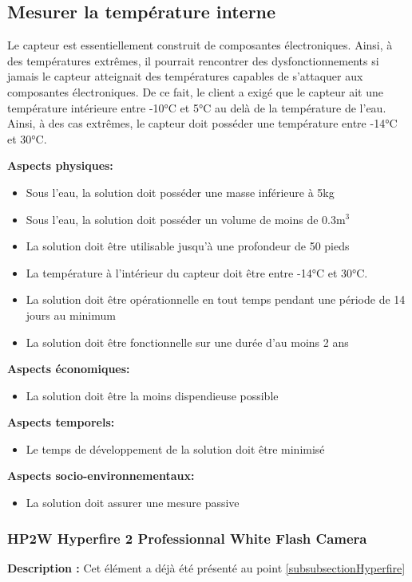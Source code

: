\subsection{Mesurer la température interne}
Le capteur est essentiellement construit de composantes électroniques. Ainsi, à des températures extrêmes, il pourrait rencontrer des dysfonctionnements si jamais le capteur atteignait des températures capables de s'attaquer aux composantes électroniques. De ce fait, le client a exigé que le capteur ait une température intérieure entre -10°C et 5°C au delà de la température de l'eau. Ainsi, à des cas extrêmes, le capteur doit posséder une température entre -14°C et 30°C.

\textbf{Aspects physiques:}
\begin{itemize}[label = {--}]
    \item Sous l'eau, la solution doit posséder une masse inférieure à 5kg
    \item Sous l'eau, la solution doit posséder un volume de moins de 0.3m$^3$
    \item La solution doit être utilisable jusqu'à une profondeur de 50 pieds
    \item La température à l'intérieur du capteur doit être entre -14°C et 30°C.
    \item La solution doit être opérationnelle en tout temps pendant une période de 14 jours au minimum
    \item La solution doit être fonctionnelle sur une durée d'au moins 2 ans
\end{itemize}

\textbf{Aspects économiques:}
\begin{itemize}[label = {--}]
    \item La solution doit être la moins dispendieuse possible
\end{itemize}

\textbf{Aspects temporels:}
\begin{itemize}[label = {--}]
    \item Le temps de développement de la solution doit être minimisé
\end{itemize}

\textbf{Aspects socio-environnementaux:}
\begin{itemize}[label = {--}]
    \item La solution doit assurer une mesure passive
\end{itemize}

\subsubsection{HP2W Hyperfire 2 Professionnal White Flash Camera}
\textbf{Description :} Cet élément a déjà été présenté au point \ref{subsubsectionHyperfire}

